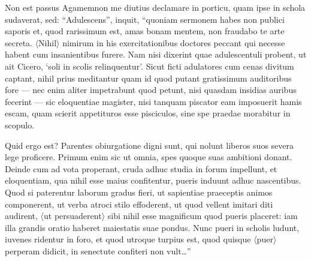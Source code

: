 Non est passus Agamemnon me diutius declamare in porticu, quam ipse in schola sudaverat, sed: ``Adulescens'', inquit, ``quoniam sermonem habes non publici saporis et, quod rarissimum est, amas bonam mentem, non fraudabo te arte secreta. $\langle$Nihil$\rangle$ nimirum in his exercitationibus doctores peccant qui necesse habent cum insanientibus furere. Nam nisi dixerint quae adulescentuli probent, ut ait Cicero, `soli in scolis relinquentur'. Sicut ficti adulatores cum cenas divitum captant, nihil prius meditantur quam id quod putant gratissimum auditoribus fore — nec enim aliter impetrabunt quod petunt, nisi quasdam insidias auribus fecerint — sic eloquentiae magister, nisi tanquam piscator eam imposuerit hamis escam, quam scierit appetituros esse pisciculos, sine spe praedae morabitur in scopulo.

Quid ergo est? Parentes obiurgatione digni sunt, qui nolunt liberos suos severa lege proficere. Primum enim sic ut omnia, spes quoque suas ambitioni donant. Deinde cum ad vota properant, cruda adhuc studia in forum impellunt, et eloquentiam, qua nihil esse maius confitentur, pueris induunt adhuc nascentibus. Quod si paterentur laborum gradus fieri, ut sapientiae praeceptis animos componerent, ut verba atroci stilo effoderent, ut quod vellent imitari diti audirent, $\langle$ut persuaderent$\rangle$ sibi nihil esse magnificum quod pueris placeret: iam illa grandis oratio haberet maiestatis suae pondus. Nunc pueri in scholis ludunt, iuvenes ridentur in foro, et quod utroque turpius est, quod quisque $\langle$puer$\rangle$ perperam didicit, in senectute confiteri non vult\dots''
